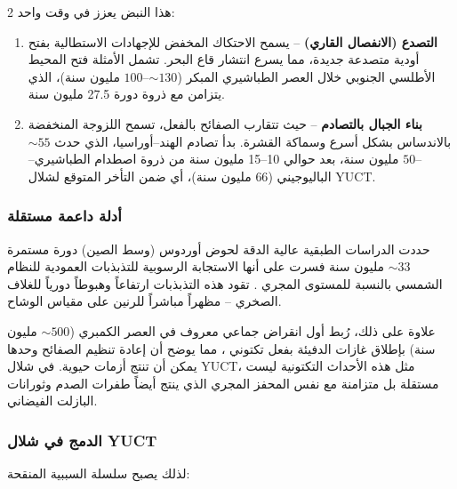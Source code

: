\documentclass[11pt,a4paper]{article}
\begin{document}
\begin{multicols}{2}
		هذا النبض يعزز في وقت واحد:
		\begin{enumerate}
			\item \textbf{التصدع (الانفصال القاري)} – يسمح الاحتكاك المخفض للإجهادات الاستطالية بفتح أودية متصدعة جديدة، مما يسرع انتشار قاع البحر. تشمل الأمثلة فتح المحيط الأطلسي الجنوبي خلال العصر الطباشيري المبكر (\(\sim 130\)–\(100\) مليون سنة)، الذي يتزامن مع ذروة دورة 27.5 مليون سنة.
			\item \textbf{بناء الجبال بالتصادم} – حيث تتقارب الصفائح بالفعل، تسمح اللزوجة المنخفضة بالاندساس بشكل أسرع وسماكة القشرة. بدأ تصادم الهند–أوراسيا، الذي حدث \(\sim 55\)–\(50\) مليون سنة، بعد حوالي 10–15 مليون سنة من ذروة اصطدام الطباشيري–الباليوجيني (66 مليون سنة)، أي ضمن التأخر المتوقع لشلال YUCT.
		\end{enumerate}
		
		\subsubsection{أدلة داعمة مستقلة}
		حددت الدراسات الطبقية عالية الدقة لحوض أوردوس (وسط الصين) دورة مستمرة \(\sim 33\) مليون سنة فسرت على أنها الاستجابة الرسوبية للتذبذبات العمودية للنظام الشمسي بالنسبة للمستوى المجري \cite{Rampino2021}. تقود هذه التذبذبات ارتفاعاً وهبوطاً دورياً للغلاف الصخري – مظهراً مباشراً للرنين على مقياس الوشاح.
		
		علاوة على ذلك، رُبط أول انقراض جماعي معروف في العصر الكمبري (\(\sim 500\) مليون سنة) بإطلاق غازات الدفيئة بفعل تكتوني \cite{Jablonski1991}، مما يوضح أن إعادة تنظيم الصفائح وحدها يمكن أن تنتج أزمات حيوية. في شلال YUCT، مثل هذه الأحداث التكتونية ليست مستقلة بل متزامنة مع نفس المحفز المجري الذي ينتج أيضاً طفرات الصدم وثورانات البازلت الفيضاني.
		
		\subsubsection{الدمج في شلال YUCT}
		لذلك يصبح سلسلة السببية المنقحة:
		
	\end{multicols}
	
	\vspace{0.3cm}
	\noindent
	\vspace{0.3cm}
	
\end{document}

